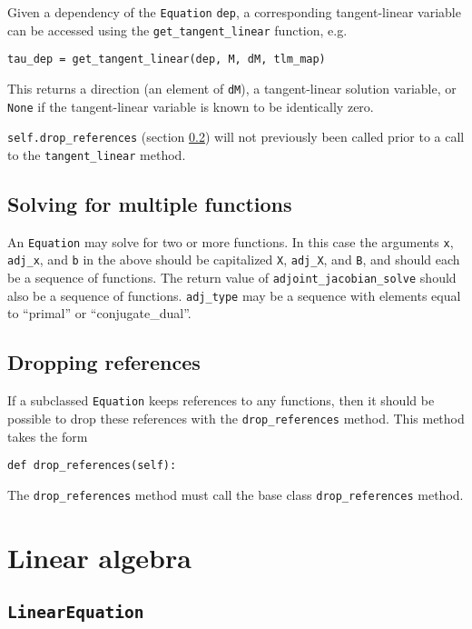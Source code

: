 \documentclass[11pt]{article}
\begin{document}
Given a dependency of the \texttt{Equation} \texttt{dep}, a corresponding
tangent-linear variable can be accessed using the \texttt{get\_tangent\_linear}
function, e.g.
\begin{lstlisting}
tau_dep = get_tangent_linear(dep, M, dM, tlm_map)
\end{lstlisting}
This returns a direction (an element of \texttt{dM}), a tangent-linear solution
variable, or \texttt{None} if the tangent-linear variable is known to be
identically zero.

\texttt{self.drop\_references} (section \ref{sect:drop_references}) will not
previously been called prior to a call to the \texttt{tangent\_linear} method.

\subsection{Solving for multiple functions}

An \texttt{Equation} may solve for two or more functions. In this case the
arguments \texttt{x}, \texttt{adj\_x}, and \texttt{b} in the above should be
capitalized \texttt{X}, \texttt{adj\_X}, and \texttt{B}, and should each be a
sequence of functions. The return value of \texttt{adjoint\_jacobian\_solve}
should also be a sequence of functions. \texttt{adj\_type} may be a sequence
with elements equal to ``primal'' or ``conjugate\_dual''.

\subsection{Dropping references}\label{sect:drop_references}

If a subclassed \texttt{Equation} keeps references to any functions, then it
should be possible to drop these references with the \texttt{drop\_references}
method. This method takes the form
\begin{lstlisting}
def drop_references(self):
\end{lstlisting}
The \texttt{drop\_references} method must call the base class
\texttt{drop\_references} method.

\section{Linear algebra}

\subsection{\texttt{LinearEquation}}
\end{document}
